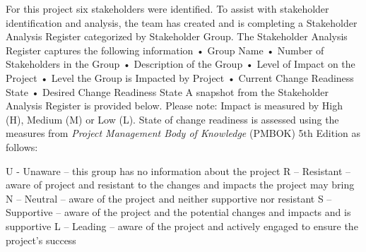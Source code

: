 For this project six stakeholders were identified. To assist with stakeholder identification and analysis, the team has created and is completing a Stakeholder Analysis Register categorized by Stakeholder Group. The Stakeholder Analysis Register captures the following information
\newline
\newline
•	Group Name
\newline
•	Number of Stakeholders in the Group
\newline
•	Description of the Group
\newline
•	Level of Impact on the Project
\newline
•	Level the Group is Impacted by Project
\newline
•	Current Change Readiness State
\newline
•	Desired Change Readiness State
\newpage
A snapshot from the Stakeholder Analysis Register is provided below.
Please note: Impact is measured by High (H), Medium (M) or Low (L).  State of change readiness is assessed using the measures from \textit{Project Management Body of Knowledge} (PMBOK) 5th Edition  as follows: 

U - Unaware – this group has no information about the project
\newline
R – Resistant – aware of project and resistant to the changes and impacts the project may bring
\newline
N – Neutral – aware of the project and neither supportive nor resistant
\newline
S – Supportive – aware of the project and the potential changes and impacts and is supportive 
\newline
L – Leading – aware of the project and actively engaged to ensure the project’s success
\newline

